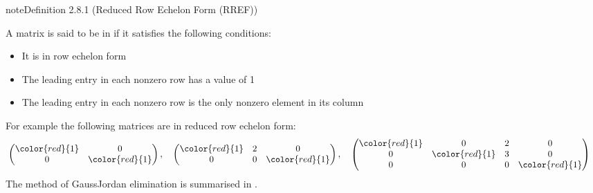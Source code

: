 \documentclass[letterpaper,10pt,english]{jupyterBook}
\begin{document}
\ignorespaces \label{_pages/2.5_Gauss_Jordan_elimination:rref-definition}
\begin{sphinxadmonition}{note}{Definition 2.8.1 (Reduced Row Echelon Form (RREF))}



\sphinxAtStartPar
A matrix is said to be in  if it satisfies the following conditions:
\begin{itemize}
\item {} 
\sphinxAtStartPar
It is in row echelon form

\item {} 
\sphinxAtStartPar
The leading entry in each non\sphinxhyphen{}zero row has a value of 1

\item {} 
\sphinxAtStartPar
The leading entry in each non\sphinxhyphen{}zero row is the only non\sphinxhyphen{}zero element in its column

\end{itemize}
\end{sphinxadmonition}

\sphinxAtStartPar
For example the following matrices are in reduced row echelon form:
\begin{equation*}
\begin{split} \begin{align*}
    &\begin{pmatrix}
        {\color{red}{1}} & 0 \\
        0 & {\color{red}{1}}
    \end{pmatrix}, &
    &\begin{pmatrix}
        {\color{red}{1}} & 2 & 0 \\
        0 & 0 & {\color{red}{1}}
    \end{pmatrix}, &
    &\begin{pmatrix}
        {\color{red}{1}} & 0 & 2 & 0 \\
        0 & {\color{red}{1}} & 3 & 0 \\
        0 & 0 & 0 & {\color{red}{1}}
    \end{pmatrix}
\end{align*} \end{split}
\end{equation*}
\sphinxAtStartPar
The method of Gauss\sphinxhyphen{}Jordan elimination is summarised in {\hyperref[\detokenize{_pages/2.5_Gauss_Jordan_elimination:gje-algorithm}]{}}.
\end{document}
